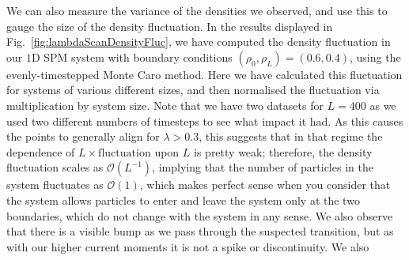We can also measure the variance of the densities we observed, and use this to gauge the size of the
density fluctuation. In the results displayed in Fig.~\ref{fig:lambdaScanDensityFluc}, we have
computed the density fluctuation in our $1$D SPM system with boundary conditions
$(\rho_0, \rho_L) = (0.6, 0.4)$, using the evenly-timestepped Monte Caro method. Here we have
calculated this fluctuation for systems of various different sizes, and then normalised the fluctuation
via multiplication by system size. Note that we have two datasets for $L=400$ as we used two different
numbers of timesteps to see what impact it had.
As this causes the points to generally align for $\lambda>0.3$, this suggests that in that regime the 
dependence of $L \times \mathrm{fluctuation}$ upon $L$ is pretty weak; therefore,
the density fluctuation scales as $\mathcal{O}(L^{-1})$, implying that the number of particles in the
system fluctuates as $\mathcal{O}(1)$, which makes perfect sense when you consider that the system
allows particles to enter and leave the system only at the two boundaries, which do not change with the
system in any sense. We also observe that there is a visible bump as we pass through the suspected
transition, but as with our higher current moments it is not a spike or discontinuity. We also
